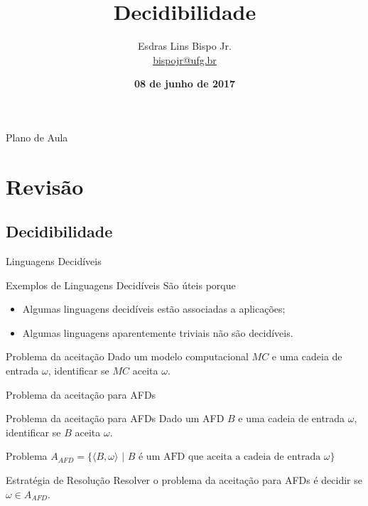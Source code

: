 \documentclass[xcolor=dvipsnames,table]{beamer}
\title{Decidibilidade}
\author{
  Esdras Lins Bispo Jr. \\ \url{bispojr@ufg.br}
  }
\institute{
  Teoria da Computação \\Bacharelado em Ciência da Computação}
\date{\textbf{08 de junho de 2017} }
\begin{document}
	\begin{frame}
		\titlepage
	\end{frame}

	\AtBeginSection{
		\begin{frame}{Sumário}%
    		\tableofcontents[currentsection]
		\end{frame}
	}

	\begin{frame}{Plano de Aula}
		\tableofcontents
	\end{frame}
    
    \section{Revisão}

	\subsection{Decidibilidade}
	
	\begin{frame}{Linguagens Decidíveis}
		\begin{block}{Exemplos de Linguagens Decidíveis}
			São úteis porque
			\begin{itemize}
				\item Algumas linguagens decidíveis estão associadas a aplicações;
				\item Algumas linguagens aparentemente triviais não são decidíveis.
			\end{itemize}
		\end{block}  
		\begin{block}{Problema da aceitação}
			Dado um modelo computacional $MC$ e uma cadeia de entrada $\omega$, identificar se $MC$ aceita $\omega$.
		\end{block}	
	\end{frame}
	
	\begin{frame}{Problema da aceitação para AFDs}
		\begin{block}{Problema da aceitação para AFDs}
			Dado um AFD $B$ e uma cadeia de entrada $\omega$, identificar se $B$ aceita $\omega$.
		\end{block}	 
		\begin{block}{Problema}
			$A_{AFD} = \{ \langle B, \omega \rangle \mbox{ | } B \mbox{ é um AFD que aceita a cadeia de entrada } \omega \}$
		\end{block}  
		\begin{block}{Estratégia de Resolução}
			Resolver o problema da aceitação para AFDs é decidir se $\omega \in A_{AFD}$.
		\end{block}
	\end{frame}
	
\end{document}
